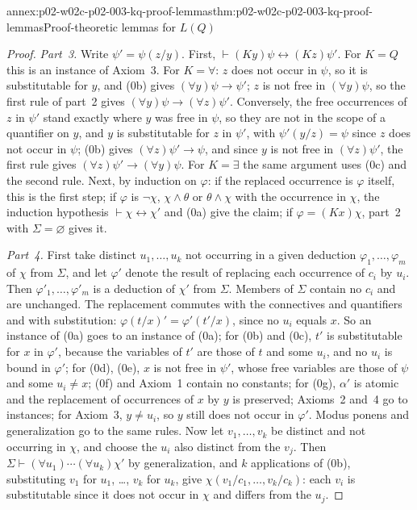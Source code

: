 \begin{annexitem}{annex:p02-w02c-p02-003-kq-proof-lemmas}{thm:p02-w02c-p02-003-kq-proof-lemmas}{Proof-theoretic lemmas for \(L(Q)\)}
\begin{proof}
\emph{Part~3.}  Write \(\psi'=\psi(z/y)\).  First,
\(\vdash(Ky)\psi\leftrightarrow(Kz)\psi'\).  For \(K=Q\) this is an
instance of Axiom~3.  For \(K=\forall\): \(z\) does not occur in \(\psi\),
so it is substitutable for \(y\), and (0b) gives \((\forall
y)\psi\to\psi'\); \(z\) is not free in \((\forall y)\psi\), so the first
rule of part~2 gives \((\forall y)\psi\to(\forall z)\psi'\).  Conversely,
the free occurrences of \(z\) in \(\psi'\) stand exactly where \(y\) was
free in \(\psi\), so they are not in the scope of a quantifier on \(y\), and
\(y\) is substitutable for \(z\) in \(\psi'\), with \(\psi'(y/z)=\psi\)
since \(z\) does not occur in \(\psi\); (0b) gives
\((\forall z)\psi'\to\psi\), and since \(y\) is not free in \((\forall
z)\psi'\), the first rule gives \((\forall z)\psi'\to(\forall y)\psi\).
For \(K=\exists\) the same argument uses (0c) and the second rule.  Next,
by induction on \(\varphi\): if the replaced occurrence is \(\varphi\)
itself, this is the first step; if \(\varphi\) is \(\neg\chi\),
\(\chi\land\theta\) or \(\theta\land\chi\) with the occurrence in \(\chi\),
the induction hypothesis \(\vdash\chi\leftrightarrow\chi'\) and (0a) give
the claim; if \(\varphi=(Kx)\chi\), part~2 with \(\Sigma=\varnothing\) gives
it.

\emph{Part~4.}  First take distinct \(u_1,\ldots,u_k\) not occurring in a
given deduction \(\varphi_1,\ldots,\varphi_m\) of \(\chi\) from \(\Sigma\),
and let \(\varphi'\) denote the result of replacing each occurrence of
\(c_i\) by \(u_i\).  Then \(\varphi'_1,\ldots,\varphi'_m\) is a deduction of
\(\chi'\) from \(\Sigma\).  Members of \(\Sigma\) contain no \(c_i\) and are
unchanged.  The replacement commutes with the connectives and quantifiers
and with substitution: \(\varphi(t/x)'=\varphi'(t'/x)\), since no \(u_i\)
equals \(x\).  So an instance of (0a) goes to an instance of (0a); for (0b)
and (0c), \(t'\) is substitutable for \(x\) in \(\varphi'\), because the
variables of \(t'\) are those of \(t\) and some \(u_i\), and no \(u_i\) is
bound in \(\varphi'\); for (0d), (0e), \(x\) is not free in \(\psi'\), whose
free variables are those of \(\psi\) and some \(u_i\neq x\); (0f) and
Axiom~1 contain no constants; for (0g), \(\alpha'\) is atomic and the
replacement of occurrences of \(x\) by \(y\) is preserved; Axioms~2 and~4
go to instances; for Axiom~3, \(y\neq u_i\), so \(y\) still does not occur
in \(\varphi'\).  Modus ponens and generalization go to the same rules.
Now let \(v_1,\ldots,v_k\) be distinct and not occurring in \(\chi\), and
choose the \(u_i\) also distinct from the \(v_j\).  Then
\(\Sigma\vdash(\forall u_1)\cdots(\forall u_k)\chi'\) by generalization,
and \(k\) applications of (0b), substituting \(v_1\) for \(u_1\), \ldots,
\(v_k\) for \(u_k\), give \(\chi(v_1/c_1,\ldots,v_k/c_k)\): each \(v_i\) is
substitutable since it does not occur in \(\chi\) and differs from the
\(u_j\).


\end{proof}
\end{annexitem}
